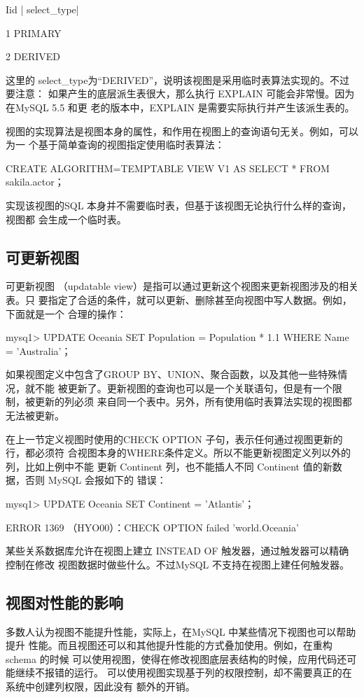 Iid | select\_type|

1 PRIMARY

2 DERIVED

这里的 select\_type为“DERIVED”，说明该视图是采用临时表算法实现的。不过要注意：
如果产生的底层派生表很大，那么执行 EXPLAIN 可能会非常慢。因为在MySQL 5.5 和更
老的版本中，EXPLAIN 是需要实际执行并产生该派生表的。

视图的实现算法是视图本身的属性，和作用在视图上的查询语句无关。例如，可以为一
个基于简单查询的视图指定使用临时表算法：

CREATE ALGORITHM=TEMPTABLE VIEW V1 AS SELECT * FROM sakila.actor；

实现该视图的SQL 本身并不需要临时表，但基于该视图无论执行什么样的查询，视图都
会生成一个临时表。

\subsection{可更新视图}
可更新视图 （updatable view）是指可以通过更新这个视图来更新视图涉及的相关表。只
要指定了合适的条件，就可以更新、删除甚至向视图中写人数据。例如，下面就是一个
合理的操作：

mysq1> UPDATE Oceania SET Population = Population * 1.1 WHERE Name = 'Australia'；

如果视图定义中包含了GROUP BY、UNION、聚合函数，以及其他一些特殊情况，就不能
被更新了。更新视图的查询也可以是一个关联语句，但是有一个限制，被更新的列必须
来自同一个表中。另外，所有使用临时表算法实现的视图都无法被更新。

在上一节定义视图时使用的CHECK OPTION 子句，表示任何通过视图更新的行，都必须符
合视图本身的WHERE条件定义。所以不能更新视图定义列以外的列，比如上例中不能
更新 Continent 列，也不能插人不同 Continent 值的新数据，否则 MySQL 会报如下的
错误：

mysq1> UPDATE Oceania SET Continent = 'Atlantis'；

ERROR 1369 （HYO00）：CHECK OPTION failed 'world.Oceania'

某些关系数据库允许在视图上建立 INSTEAD OF 触发器，通过触发器可以精确控制在修改
视图数据时做些什么。不过MySQL 不支持在视图上建任何触发器。

\subsection{视图对性能的影响}
多数人认为视图不能提升性能，实际上，在MySQL 中某些情况下视图也可以帮助提升
性能。而且视图还可以和其他提升性能的方式叠加使用。例如，在重构schema 的时候
可以使用视图，使得在修改视图底层表结构的时候，应用代码还可能继续不报错的运行。
可以使用视图实现基于列的权限控制，却不需要真正的在系统中创建列权限，因此没有
额外的开销。

